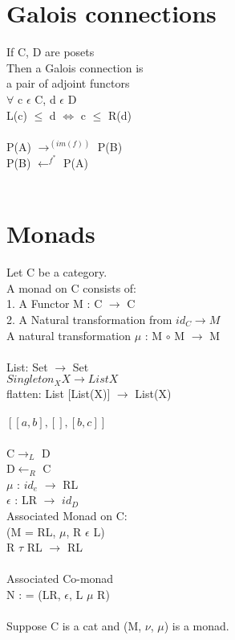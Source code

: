 \documentclass{article}
\begin{document}
\section{Galois connections}
If C, D are posets
\\
Then a Galois connection is 
\\
a pair of adjoint functors
\\
$\forall$ c $\epsilon$ C, d $\epsilon$ D
\\
L(c) $\leq$ d $\iff$ c $\leq$ R(d)
\\
\\
P(A) $\rightarrow^(im(f))$ P(B)
\\
P(B) $\leftarrow^{f^{*}}$ P(A)
\\
\\
\section{Monads}
Let C be a category. 
\\
A monad on C consists of:
\\
1. A Functor M : C $\rightarrow$ C
\\
2. A Natural transformation from $id_{C} \rightarrow M$
\\
A natural transformation $\mu$ : M $\circ$ M $\rightarrow$ M 
\\
\\
List: Set $\rightarrow$ Set
\\
$Singleton_{X} X \rightarrow List X$
\\
flatten: List [List(X)] $\rightarrow$ List(X)
\\
\\
$[ [a, b], [ ], [b, c] ]$
\\
\\
C$\rightarrow_{L}$ D
\\
D$\leftarrow_{R}$ C
\\
$\mu$ : $id_{e}$ $\rightarrow$ RL
\\
$\epsilon$ : LR $\rightarrow$ $id_{D}$
\\
Associated Monad on C:
\\
(M = RL, $\mu$, R $\epsilon$ L)
\\
R $\tau$ RL $\rightarrow$ RL
\\
\\
Associated Co-monad
\\
N : = (LR, $\epsilon$, L $\mu$ R)
\\
\\
Suppose C is a cat and (M, $\nu$, $\mu$) is a monad.
\\
\end{document}
